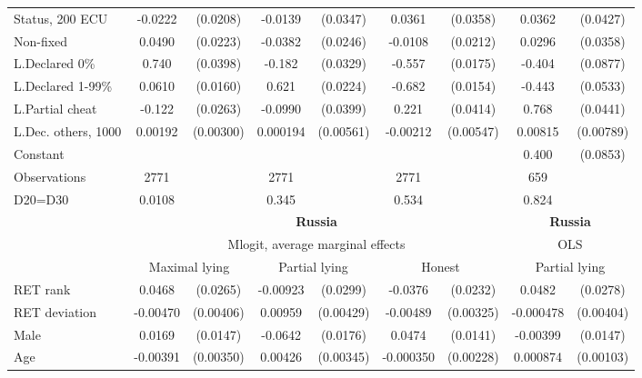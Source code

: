 \begin{tabular}{l|cccccc|cc}
Status, 200 ECU&  -0.0222         & (0.0208)&  -0.0139         & (0.0347)&   0.0361         & (0.0358)&   0.0362         & (0.0427)\\
Non-fixed     &   0.0490\sym{**} & (0.0223)&  -0.0382         & (0.0246)&  -0.0108         & (0.0212)&   0.0296         & (0.0358)\\
L.Declared 0\%&    0.740\sym{***}& (0.0398)&   -0.182\sym{***}& (0.0329)&   -0.557\sym{***}& (0.0175)&   -0.404\sym{***}& (0.0877)\\
L.Declared 1-99\%&   0.0610\sym{***}& (0.0160)&    0.621\sym{***}& (0.0224)&   -0.682\sym{***}& (0.0154)&   -0.443\sym{***}& (0.0533)\\
L.Partial cheat &   -0.122\sym{***}& (0.0263)&  -0.0990\sym{**} & (0.0399)&    0.221\sym{***}& (0.0414)&    0.768\sym{***}& (0.0441)\\
L.Dec. others, 1000&  0.00192         &(0.00300)& 0.000194         &(0.00561)& -0.00212         &(0.00547)&  0.00815         &(0.00789)\\
Constant        &                  &         &                  &         &                  &         &    0.400\sym{***}& (0.0853)\\
\hline
Observations    &     2771         &         &     2771         &         &     2771         &         &      659         &         \\
D20=D30         &   0.0108         &         &    0.345         &         &    0.534         &         &    0.824         &         \\
\hline\hline
&\multicolumn{6}{c|}{\bf Russia}&\multicolumn{2}{c}{\bf Russia}\\ &\multicolumn{6}{c|}{Mlogit, average marginal effects }&\multicolumn{2}{c}{OLS}\\
                &\multicolumn{2}{c}{Maximal lying}&\multicolumn{2}{c}{Partial lying}&\multicolumn{2}{c|}{Honest}  &\multicolumn{2}{c}{Partial lying}\\
\hline
RET rank        &   0.0468\sym{*}  & (0.0265)& -0.00923         & (0.0299)&  -0.0376         & (0.0232)&   0.0482\sym{*}  & (0.0278)\\
RET deviation   & -0.00470         &(0.00406)&  0.00959\sym{**} &(0.00429)& -0.00489         &(0.00325)&-0.000478         &(0.00404)\\
Male            &   0.0169         & (0.0147)&  -0.0642\sym{***}& (0.0176)&   0.0474\sym{***}& (0.0141)& -0.00399         & (0.0147)\\
Age             & -0.00391         &(0.00350)&  0.00426         &(0.00345)&-0.000350         &(0.00228)& 0.000874         &(0.00103)\\

\end{tabular}
